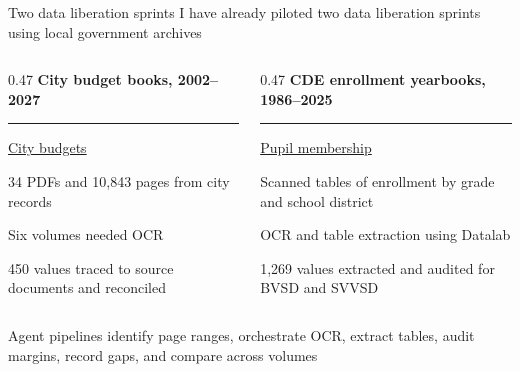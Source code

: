 \documentclass[9pt,aspectratio=169,onlytextwidth]{beamer}
\begin{document}

\begin{frame}{Two data liberation sprints}
    I have already piloted two data liberation sprints using local government archives

    \bigskip

    \begin{columns}\small 
        \begin{column}{0.47\textwidth} 
            \textbf{City budget books, 2002--2027}\par\vspace{-5pt}\rule{\linewidth}{0.1em}

            \smallskip

            \href{https://documents.bouldercolorado.gov/WebLink/Browse.aspx?id=187445&dbid=0&repo=LF8PROD2&cr=1}{City budgets}
            
            \smallskip
            
            34 PDFs and 10,843 pages from city records

            \smallskip
            
            Six volumes needed OCR

            \smallskip

            450 values traced to source documents and reconciled
        \end{column}
        \begin{column}{0.47\textwidth} 
            \textbf{CDE enrollment yearbooks, 1986--2025}\par\vspace{-5pt}\rule{\linewidth}{0.1em}
            
            \smallskip

            \href{https://spl.cde.state.co.us/artemis/edserials/ed27919internet/}{Pupil membership}

            \smallskip
            
            Scanned tables of enrollment by grade and school district

            \smallskip

            OCR and table extraction using Datalab

            \smallskip

            1,269 values extracted and audited for BVSD and SVVSD
        \end{column}
    \end{columns}

    \bigskip

    Agent pipelines identify page ranges, orchestrate OCR, extract tables, audit margins, record gaps, and compare across volumes
\end{frame}
\end{document}
